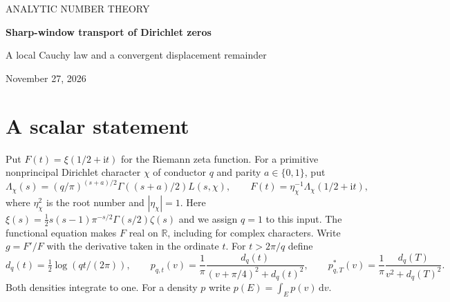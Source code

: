 \documentclass[11pt]{article}
\newcommand{\R}{\mathbb R}\newcommand{\C}{\mathbb C}
\newcommand{\dd}{\,\mathrm d}\newcommand{\ii}{\mathrm i}
\begin{document}
\thispagestyle{plain}
\begin{center}
{\small\sffamily\color{ink} ANALYTIC NUMBER THEORY}\par\vspace{7pt}
{\LARGE\bfseries Sharp-window transport of Dirichlet zeros}\par\vspace{5pt}
{\large A local Cauchy law and a convergent displacement remainder}\par\vspace{9pt}
{\small November 27, 2026}
\end{center}

\begin{abstract}
We prove a sharp-interval formula for the spectral shift of Hermitian couplings of completed Dirichlet functions, using Dirichlet GRH. The formula has a dimension-free endpoint error, uniform in the conductors and both coupling matrices. For a single character it gives a relative Cauchy law simultaneously for every Borel set of values of the real logarithmic derivative, on every interval of length $H$ with $H\log\log(qT)\to\infty$. The error scales with the probability of the set, even arbitrarily far in the tails. For a fixed coupling, subtracting an explicit function of the conductors and matrices from the accumulated displacement leaves a finite limit, with error $O(1/(\log T\log\log T))$. An elementary rectangle estimate for the Cayley transform and a positive combination of Poisson kernels give the endpoint control.
\end{abstract}

\section{A scalar statement}
Put $F(t)=\xi(1/2+\ii t)$ for the Riemann zeta function. For a primitive nonprincipal Dirichlet character $\chi$ of conductor $q$ and parity $a\in\{0,1\}$, put
\[
 \Lambda_\chi(s)=(q/\pi)^{(s+a)/2}\Gamma((s+a)/2)L(s,\chi),
 \qquad F(t)=\eta_\chi^{-1}\Lambda_\chi(1/2+\ii t),
\]
where $\eta_\chi^2$ is the root number and $|\eta_\chi|=1$. Here $\xi(s)=\tfrac12s(s-1)\pi^{-s/2}\Gamma(s/2)\zeta(s)$ and we assign $q=1$ to this input. The functional equation makes $F$ real on $\R$, including for complex characters. Write $g=F'/F$ with the derivative taken in the ordinate $t$. For $t>2\pi/q$ define
\[
 d_q(t)=\tfrac12\log(qt/(2\pi)),\qquad
 p_{q,t}(v)=\frac{1}{\pi}\frac{d_q(t)}{(v+\pi/4)^2+d_q(t)^2},\qquad
 p^*_{q,T}(v)=\frac{1}{\pi}\frac{d_q(T)}{v^2+d_q(T)^2}.
\]
Both densities integrate to one. For a density $p$ write $p(E)=\int_E p(v)\dd v$.
\end{document}
